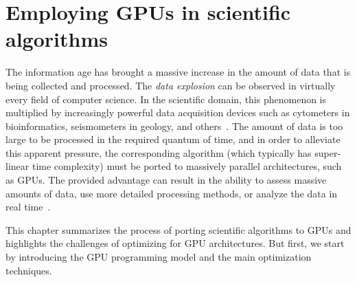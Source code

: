 \chapter{Employing GPUs in scientific algorithms}
\label{chap:gpu}

The information age has brought a massive increase in the amount of data that is being collected and processed. The \emph{data explosion} can be observed in virtually every field of computer science. In the scientific domain, this phenomenon is multiplied by increasingly powerful data acquisition devices such as cytometers in bioinformatics, seismometers in geology, and others~\cite{brestoff2022contemporary,zhou2021high}. The amount of data is too large to be processed in the required quantum of time, and in order to alleviate this apparent pressure, the corresponding algorithm (which typically has super-linear time complexity) must be ported to massively parallel architectures, such as GPUs. The provided advantage can result in the ability to assess massive amounts of data, use more detailed processing methods, or analyze the data in real time~\cite{pratx2011gpu,navarro2014survey}.

This chapter summarizes the process of porting scientific algorithms to GPUs and highlights the challenges of optimizing for GPU architectures. But first, we start by introducing the GPU programming model and the main optimization techniques.






